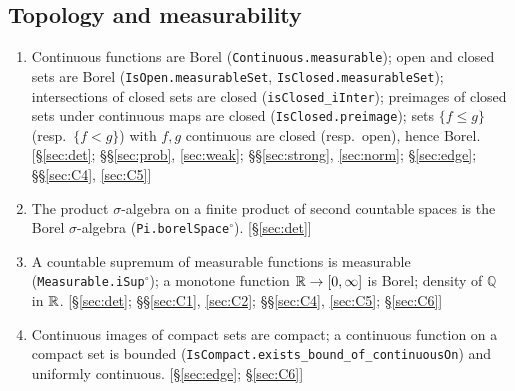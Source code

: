 \subsection{Topology and measurability}
\begin{enumerate}[leftmargin=2em,itemsep=1pt]\raggedright
\item Continuous functions are Borel (\texttt{Continuous.measurable}); open and closed sets are Borel (\texttt{IsOpen.measurableSet}, \texttt{IsClosed.measurableSet}); intersections of closed sets are closed
(\texttt{isClosed\_iInter}); preimages of closed sets under continuous maps are closed (\texttt{IsClosed.preimage}); sets $\{f\le g\}$ (resp.\ $\{f<g\}$) with $f,g$ continuous are closed (resp.\ open), hence Borel.
\hfill[\S\ref{sec:det}; \S\S\ref{sec:prob}, \ref{sec:weak}; \S\S\ref{sec:strong}, \ref{sec:norm}; \S\ref{sec:edge}; \S\S\ref{sec:C4}, \ref{sec:C5}]
\item The product $\sigma$-algebra on a finite product of second countable spaces is the Borel $\sigma$-algebra (\texttt{Pi.borelSpace}$^\circ$). \hfill[\S\ref{sec:det}]
\item A countable supremum of measurable functions is measurable (\texttt{Measurable.iSup}$^\circ$); a monotone function $\mathbb{R}\to[0,\infty]$ is Borel; density of $\mathbb Q$ in $\mathbb{R}$. \hfill[\S\ref{sec:det}; \S\S\ref{sec:C1}, \ref{sec:C2}; \S\S\ref{sec:C4}, \ref{sec:C5}; \S\ref{sec:C6}]
\item Continuous images of compact sets are compact; a continuous function on a compact set is bounded (\texttt{IsCompact.exists\_bound\_of\_continuousOn}) and uniformly continuous. \hfill[\S\ref{sec:edge}; \S\ref{sec:C6}]
\end{enumerate}

